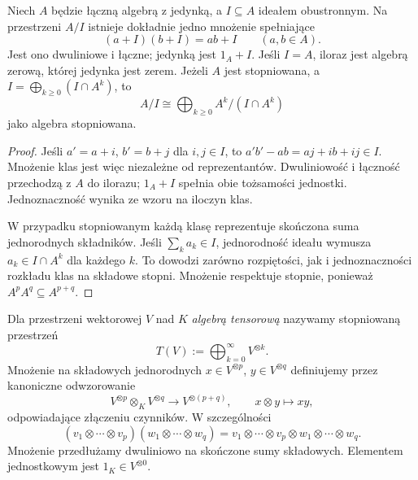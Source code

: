 \begin{stwierdzenie}
\label{prop:lin11-iloraz-algebry}
Niech \(A\) będzie łączną algebrą z jedynką,
a \(I\subseteq A\) ideałem obustronnym.
Na przestrzeni \(A/I\) istnieje dokładnie jedno
mnożenie spełniające
\[
 (a+I)(b+I)=ab+I\qquad(a,b\in A).
\]
Jest ono dwuliniowe i łączne; jedynką jest
\(1_A+I\). Jeśli \(I=A\), iloraz jest
algebrą zerową, której jedynka jest zerem.
Jeżeli \(A\) jest stopniowana, a
\(I=\bigoplus_{k\geq0}(I\cap A^k)\), to
\[
 A/I\cong\bigoplus_{k\geq0}
       A^k/(I\cap A^k)
\]
jako algebra stopniowana.
\end{stwierdzenie}
\begin{proof}
Jeśli \(a'=a+i\), \(b'=b+j\)
dla \(i,j\in I\), to
\(a'b'-ab=aj+ib+ij\in I\).
Mnożenie klas jest więc niezależne od
reprezentantów. Dwuliniowość i łączność
przechodzą z \(A\) do ilorazu;
\(1_A+I\) spełnia obie tożsamości jednostki.
Jednoznaczność wynika ze wzoru na iloczyn klas.

W przypadku stopniowanym każdą klasę
reprezentuje skończona suma
jednorodnych składników. Jeśli
\(\sum_k a_k\in I\), jednorodność ideału
wymusza \(a_k\in I\cap A^k\)
dla każdego \(k\). To dowodzi zarówno
rozpiętości, jak i jednoznaczności
rozkładu klas na składowe stopni.
Mnożenie respektuje stopnie,
ponieważ \(A^pA^q\subseteq A^{p+q}\).
\end{proof}

\begin{definicja}
\label{def:lin11-tensorowa}
Dla przestrzeni wektorowej \(V\) nad \(K\)
\emph{algebrą tensorową} nazywamy
stopniowaną przestrzeń
\[
 T(V):=\bigoplus_{k=0}^{\infty}V^{\otimes k}.
\]
Mnożenie na składowych jednorodnych
\(x\in V^{\otimes p}\),
\(y\in V^{\otimes q}\) definiujemy
przez kanoniczne odwzorowanie
\[
 V^{\otimes p}\otimes_K V^{\otimes q}
 \longrightarrow V^{\otimes(p+q)},
 \qquad x\otimes y\longmapsto xy,
\]
odpowiadające złączeniu czynników.
W szczególności
\[
 (v_1\otimes\cdots\otimes v_p)
 (w_1\otimes\cdots\otimes w_q)
 =v_1\otimes\cdots\otimes v_p
  \otimes w_1\otimes\cdots\otimes w_q.
\]
Mnożenie przedłużamy dwuliniowo na
skończone sumy składowych.
Elementem jednostkowym jest \(1_K\in V^{\otimes0}\).
\end{definicja}

